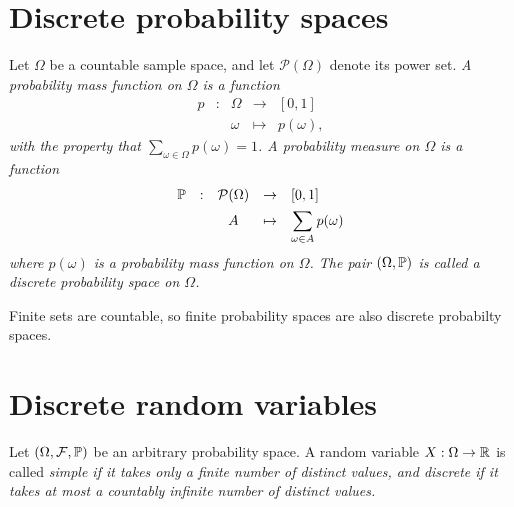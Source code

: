 \section{Discrete probability spaces}

\begin{definition}
Let $\Omega$ be a countable sample space, and let $\mathcal{P}(\Omega)$ denote its power set.
\ben
\it %
A \emph{probability mass function} on $\Omega$ is a function
\[
\begin{array}{ccccc}
p 	& :	& \Omega		& \to 		& [0,1] \\
	&	& \omega		& \mapsto	& p(\omega),
\end{array}
\]
with the property that $\displaystyle\sum_{\omega\in\Omega} p(\omega) = 1$.
\it %
A \emph{probability measure} on $\Omega$ is a function 
\[
\begin{array}{ccccl}
\mathbb{P} 	& :	& \mathcal{P}(\Omega)	& \to 		& [0,1] \\[1ex]
		&	& A						& \mapsto	& \displaystyle\sum_{\omega\in A} p(\omega)
\end{array}
\]
where $p(\omega)$ is a probability mass function on $\Omega$.
\it %
The pair $(\Omega,\mathbb{P})$ is called a \emph{discrete probability space} on $\Omega$.
\een
\end{definition}

\begin{remark}
Finite sets are countable, so finite probability spaces are also discrete probabilty spaces.
\end{remark}

\section{Discrete random variables}

\begin{definition}
Let $(\Omega,\mathcal{F},\mathbb{P})$ be an arbitrary probability space. A random variable $X:\Omega\to\mathbb{R}$ is called
\ben
\it \emph{simple} if it takes only a finite number of distinct values, and 
\it \emph{discrete} if it takes at most a countably infinite number of distinct values.
\een
\end{definition}

